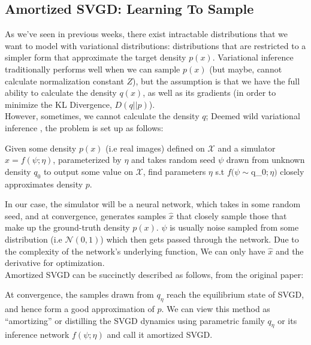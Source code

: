\documentclass[12pt]{article}
\begin{document}
\subsection{Amortized SVGD: Learning To Sample}

\noindent As we've seen in previous weeks, there exist intractable distributions that we want to model with variational distributions: distributions that are restricted to a simpler form that approximate the target density $p(x)$. Variational inference traditionally performs well when we can sample $p(x)$ (but maybe, cannot calculate normalization constant $Z$), but the assumption is that we have the full ability to calculate the density $q(x)$, as well as its gradients (in order to minimize the KL Divergence, $D(q || p)$). \\ 

\noindent However, sometimes, we cannot calculate the density $q$; Deemed wild variational inference \cite{ranganath2016operator}, the problem is set up as follows: \\ 

\begin{displayquote}
Given some density $p(x)$ (i.e real images) defined on $\mathcal{X}$ and a simulator $\hat x = f(\psi; \eta)$, parameterized by $\eta$ and takes random seed $\psi$ drawn from unknown density $q_0$ to output some value on $\mathcal{X}$, find parameters $\eta$ s.t $f(\psi \sim $q_0$; \eta)$ closely approximates density $p$.
\end{displayquote}

\noindent In our case, the simulator will be a neural network, which takes in some random seed, and at convergence, generates samples $\hat x$ that closely sample those that make up the ground-truth density $p(x)$. $\psi$ is usually noise sampled from some distribution (i.e $\mathcal{N}(0, 1)$) which then gets passed through the network. Due to the complexity of the network's underlying function, We can only have $\hat x$ and the derivative for optimization. \\

\noindent Amortized SVGD can be succinctly described as follows, from the original paper: \\

\begin{displayquote}
At convergence, the samples drawn from $q_\eta$ reach the equilibrium state of SVGD, and hence form a good approximation of $p$. We can view this method as “amortizing” or distilling the SVGD dynamics using parametric family $q_\eta$ or its inference network $f(\psi; \eta)$ and call it amortized SVGD.
\end{displayquote}
\end{document}
